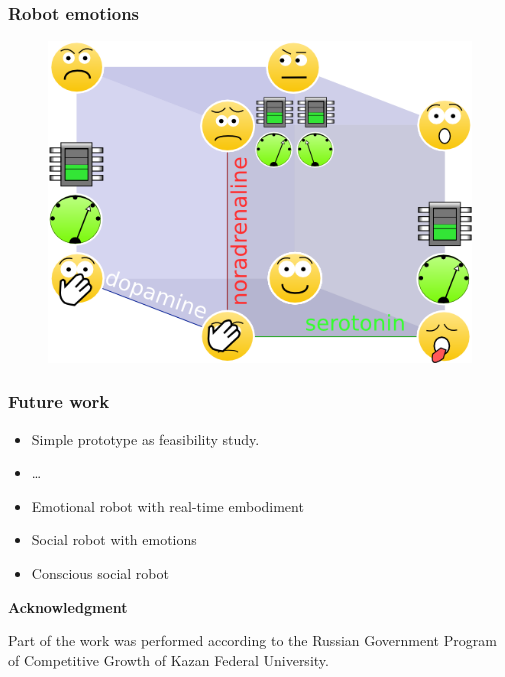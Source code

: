 \documentclass[12pt, aspectratio=169]{beamer}
\begin{document}

\begin{frame}
\frametitle{Robot emotions}
\begin{figure}
\includegraphics[width=0.7\linewidth]{cube_of_emotional_parameters_machine}
\end{figure}
\end{frame}



\begin{frame}
  \frametitle{Future work}
  
\begin{itemize}
  \item Simple prototype as feasibility study.
  \item \ldots\
  \item Emotional robot with real-time embodiment
  \item Social robot with emotions
  \item Conscious social robot
\end{itemize}

\textbf{Acknowledgment}

Part of the work was performed according to the Russian Government Program of Competitive Growth of Kazan Federal University.

\end{frame}



\end{document}
